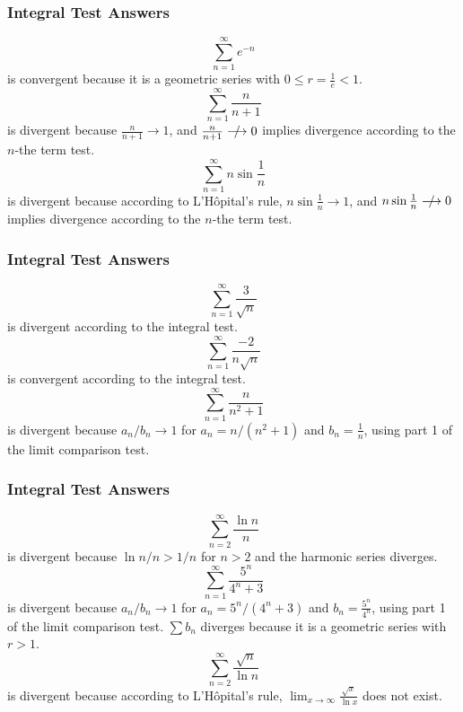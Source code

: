 \documentclass[xcolor=dvipsnames]{beamer}
\begin{document}
\begin{frame}
  \frametitle{Integral Test Answers}
  \begin{equation}
    \label{eq:epeiveix}
    \sum_{n=1}^{\infty}e^{-n}
  \end{equation}
is convergent because it is a geometric series with
$0\leq{}r=\frac{1}{e}<1$.
\begin{equation}
  \label{eq:bauveeze}
\sum_{n=1}^{\infty}\frac{n}{n+1}  
\end{equation}
is divergent because $\frac{n}{n+1}\longrightarrow{}1$, and
$\frac{n}{n+1}\qeq{}0$ implies divergence
according to the $n$-the term test.
\begin{equation}
  \label{eq:uithaezi}
\sum_{n=1}^{\infty}n\sin\frac{1}{n}  
\end{equation}
is divergent because according to L'H{\^o}pital's rule,
$n\sin\frac{1}{n}\longrightarrow{}1$, and $n\sin\frac{1}{n}\qeq{}0$ implies divergence
according to the $n$-the term test.
\end{frame}

\begin{frame}
  \frametitle{Integral Test Answers}
  \begin{equation}
    \label{eq:voomeijo}
\sum_{n=1}^{\infty}\frac{3}{\sqrt{n}}    
\end{equation}
is divergent according to the integral test.
\begin{equation}
  \label{eq:oageevae}
\sum_{n=1}^{\infty}\frac{-2}{n\sqrt{n}}  
\end{equation}
is convergent according to the integral test.
\begin{equation}
  \label{eq:phoewahg}
  \sum_{n=1}^{\infty}\frac{n}{n^{2}+1}
\end{equation}
is divergent because $a_{n}/b_{n}\longrightarrow{}1$ for
$a_{n}=n/(n^{2}+1)$ and $b_{n}=\frac{1}{n}$, using part 1 of the limit
comparison test.
\end{frame}

\begin{frame}
  \frametitle{Integral Test Answers}
  \begin{equation}
    \label{eq:ziegaequ}
    \sum_{n=2}^{\infty}\frac{\ln{}n}{n}
  \end{equation}
  is divergent because $\ln{}n/n>1/n$ for $n>2$ and the harmonic
  series diverges.
  \begin{equation}
    \label{eq:ezahraox}
    \sum_{n=1}^{\infty}\frac{5^{n}}{4^{n}+3}
  \end{equation}
is divergent because $a_{n}/b_{n}\longrightarrow{}1$ for
$a_{n}=5^{n}/(4^{n}+3)$ and $b_{n}=\frac{5^{n}}{4^{n}}$, using part 1 of the limit
comparison test. $\sum{}b_{n}$ diverges because it is a geometric
series with $r>1$.
\begin{equation}
  \label{eq:queiquai}
  \sum_{n=2}^{\infty}\frac{\sqrt{n}}{\ln{}n}
\end{equation}
is divergent because according to L'H{\^o}pital's rule,
$\lim_{x\rightarrow{}\infty}\frac{\sqrt{x}}{\ln{}x}$ does not exist.
\end{frame}
\end{document}
